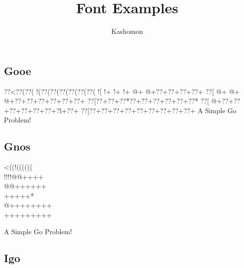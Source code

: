 \documentclass{article}
\begin{document}
\title{Font Examples}
\author{Kashomon}
\maketitle

\begin{center}
\section*{Gooe}
{\goo
\0??<\0??(\0??(\- !(\0??(\0??(\0??(\0??(\0??(\0??(
\- ![\- !+\- !+\- !+\- @+\- @+\0??+\0??+\0??+\0??+
\0??[\- @+\- @+\- @+\0??+\0??+\0??+\0??+\0??+\0??+
\0??[\0??+\0??+\0??*\0??+\0??+\0??+\0??+\0??+\0??*
\0??[\- @+\0??+\0??+\0??+\0??+\0??+\0??+\0?l+\0??+
\0??[\0??+\0??+\0??+\0??+\0??+\0??+\0??+\0??+\0??+
}
A Simple Go Problem!
\end{center}

\begin{center}
\section*{Gnos}
{\gnos%
<((!((((((\\
!!!!@@++++\\
@@++++++\\
+++++*\\
@++++++++\\
+++++++++\\
}

A Simple Go Problem!
\end{center}

\begin{center}
\section*{Igo}
\end{center}
\end{document}
